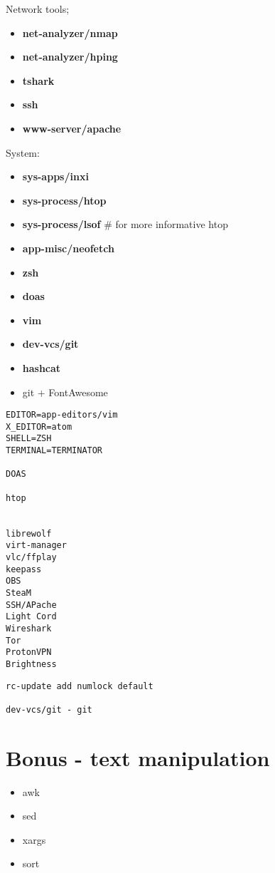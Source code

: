 \documentclass[10pt, a4paper, onecolumn, openany]{book}         %
\begin{document}
%

Network tools;
\begin{itemize}
    \item \textbf{net-analyzer/nmap}
    \item \textbf{net-analyzer/hping}
    \item \textbf{tshark}
    \item \textbf{ssh}
    \item \textbf{www-server/apache}
    
\end{itemize}



System:
\begin{itemize}
    \item \textbf{sys-apps/inxi}
    \item \textbf{sys-process/htop}
    \item \textbf{sys-process/lsof} \# for more informative htop
    \item \textbf{app-misc/neofetch}
    
    \item \textbf{zsh}
    \item \textbf{doas}

    \item \textbf{vim}
    \item \textbf{dev-vcs/git}

    \item \textbf{hashcat}
    \item git + FontAwesome
\end{itemize}



\begin{Verbatim}[commandchars=\\\{\}]
EDITOR=app-editors/vim
X_EDITOR=atom
SHELL=ZSH
TERMINAL=TERMINATOR

DOAS

htop


librewolf
virt-manager
vlc/ffplay
keepass
OBS
SteaM
SSH/APache
Light Cord
Wireshark
Tor
ProtonVPN
Brightness
\end{Verbatim}

\begin{Verbatim}[commandchars=\\\{\}]
rc-update add numlock default

dev-vcs/git - git
\end{Verbatim}

\section{Bonus - text manipulation}
\begin{itemize}
    \item awk
    \item sed
    \item xargs
    \item sort
\end{itemize}
\end{document}
